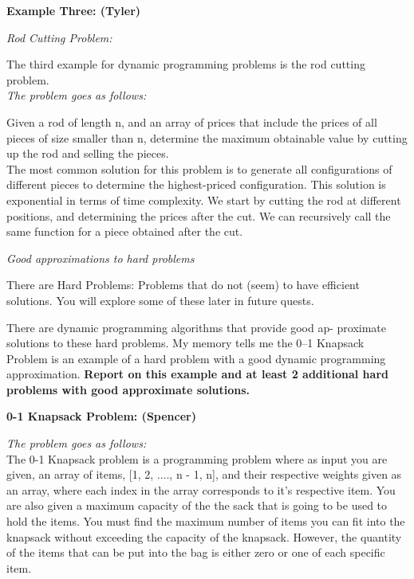 \documentclass{article}
\begin{document}
\bigskip

\noindent \textbf{Example Three: (Tyler)}


\noindent \textit{Rod Cutting Problem:}

The third example for dynamic programming problems is the rod cutting problem.\\

\noindent \textit{The problem goes as follows:}

Given a rod of length n, and an array of prices that include the prices of all 
pieces of size smaller than n, determine the maximum obtainable value by
cutting up the rod and selling the pieces.\\

The most common solution for this problem is to generate all configurations
of different pieces to determine the highest-priced configuration. This solution is
exponential in terms of time complexity. We start by cutting the rod at different
positions, and determining the prices after the cut. We can recursively call the
same function for a piece obtained after the cut.

\bigskip

\pagebreak

\noindent \textit{Good approximations to hard problems}

\medskip

There are Hard Problems: Problems that do not (seem) to have efficient solutions.
You will explore some of these later in future quests.

\medskip

There are dynamic programming algorithms that provide good ap-
proximate solutions to these hard problems. My memory tells me the
0–1 Knapsack Problem is an example of a hard problem with a good
dynamic programming approximation. \textbf{Report on this example and
at least 2 additional hard problems with good approximate solutions.}

\bigskip

\noindent \textbf{0-1 Knapsack Problem: (Spencer)} 

\noindent \textit{The problem goes as follows:} \\

The 0-1 Knapsack problem is a programming problem where as input you
are given, an array of items, [1, 2, ...., n - 1, n], and their 
respective weights given as an array, where each index in the array
corresponds to it's respective item. You are also given a maximum capacity
of the the sack that is going to be used to hold the items. You must find
the maximum number of items you can fit into the knapsack without exceeding
the capacity of the knapsack. However, the quantity of the items that can
be put into the bag is either zero or one of each specific item.
\end{document}
